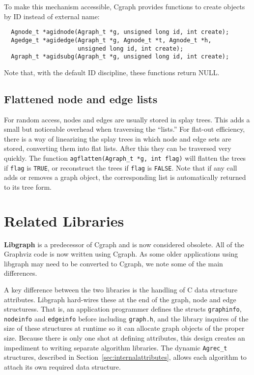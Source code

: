 \documentclass[11pt,letterpaper]{article}
\begin{document}
To make this mechanism accessible, Cgraph provides functions
to create objects by ID instead of external name:
\begin{verbatim}
  Agnode_t *agidnode(Agraph_t *g, unsigned long id, int create);
  Agedge_t *agidedge(Agraph_t *g, Agnode_t *t, Agnode_t *h, 
                     unsigned long id, int create);
  Agraph_t *agidsubg(Agraph_t *g, unsigned long id, int create);
\end{verbatim}
Note that, with the default ID discipline, these functions return NULL.

\subsection{Flattened node and edge lists}
For random access, nodes and edges are usually stored in splay trees. 
This adds a small but noticeable overhead when traversing the ``lists.''
For flat-out efficiency,
there is a way of linearizing the splay trees in which node
and edge sets are stored, converting them into flat lists.  After
this they can be traversed very quickly. The function
\verb"agflatten(Agraph_t *g, int flag)" 
will flatten the trees if \verb"flag" is \verb"TRUE",
or reconstruct the trees if \verb"flag" is \verb"FALSE".
Note that if any call adds or removes a graph object, the corresponding list
is automatically returned to its tree form.

\section{Related Libraries}
\label{sec:relatedlibraries}
{\bf Libgraph} is a predecessor of Cgraph and is now considered
obsolete. All of the Graphviz code is now written using Cgraph.
As some older applications using libgraph
may need to be converted to Cgraph, we note some of the main
differences.

A key difference between the two libraries is the handling of
C data structure attributes.  Libgraph hard-wires these
at the end of the graph, node and edge structuress.  That is,
an application programmer defines the structs {\tt graphinfo}, {\tt nodeinfo}
and {\tt edgeinfo} before including {\tt graph.h}, and the library inquires of
the size of these structures at runtime so it can allocate graph
objects of the proper size.  Because there is only one shot at
defining attributes, this design creates an impediment to writing
separate algorithm libraries.
The dynamic \verb"Agrec_t" structures, described in Section~\ref{sec:internalattributes}, 
allows each algorithm to attach its own required data structure.
\end{document}
